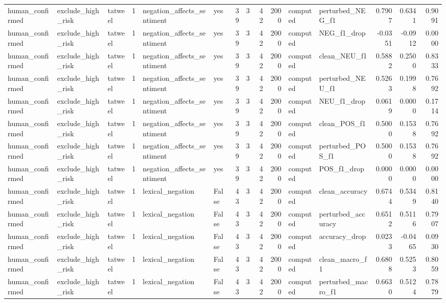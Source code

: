 \begin{tabular}{lllrllrrrrllrrr}
human_confirmed & exclude_high_risk & tatweel & 1 & negation_affects_sentiment & yes & 39 & 3 & 42 & 2000 & computed & perturbed_NEG_f1 & 0.7907 & 0.6341 & 0.9091 \\
human_confirmed & exclude_high_risk & tatweel & 1 & negation_affects_sentiment & yes & 39 & 3 & 42 & 2000 & computed & NEG_f1_drop & -0.0351 & -0.0912 & 0.0000 \\
human_confirmed & exclude_high_risk & tatweel & 1 & negation_affects_sentiment & yes & 39 & 3 & 42 & 2000 & computed & clean_NEU_f1 & 0.5882 & 0.2500 & 0.8333 \\
human_confirmed & exclude_high_risk & tatweel & 1 & negation_affects_sentiment & yes & 39 & 3 & 42 & 2000 & computed & perturbed_NEU_f1 & 0.5263 & 0.1998 & 0.7692 \\
human_confirmed & exclude_high_risk & tatweel & 1 & negation_affects_sentiment & yes & 39 & 3 & 42 & 2000 & computed & NEU_f1_drop & 0.0619 & 0.0000 & 0.1714 \\
human_confirmed & exclude_high_risk & tatweel & 1 & negation_affects_sentiment & yes & 39 & 3 & 42 & 2000 & computed & clean_POS_f1 & 0.5000 & 0.1538 & 0.7692 \\
human_confirmed & exclude_high_risk & tatweel & 1 & negation_affects_sentiment & yes & 39 & 3 & 42 & 2000 & computed & perturbed_POS_f1 & 0.5000 & 0.1538 & 0.7692 \\
human_confirmed & exclude_high_risk & tatweel & 1 & negation_affects_sentiment & yes & 39 & 3 & 42 & 2000 & computed & POS_f1_drop & 0.0000 & 0.0000 & 0.0000 \\
human_confirmed & exclude_high_risk & tatweel & 1 & lexical_negation & False & 43 & 3 & 42 & 2000 & computed & clean_accuracy & 0.6744 & 0.5349 & 0.8140 \\
human_confirmed & exclude_high_risk & tatweel & 1 & lexical_negation & False & 43 & 3 & 42 & 2000 & computed & perturbed_accuracy & 0.6512 & 0.5116 & 0.7907 \\
human_confirmed & exclude_high_risk & tatweel & 1 & lexical_negation & False & 43 & 3 & 42 & 2000 & computed & accuracy_drop & 0.0233 & -0.0465 & 0.0930 \\
human_confirmed & exclude_high_risk & tatweel & 1 & lexical_negation & False & 43 & 3 & 42 & 2000 & computed & clean_macro_f1 & 0.6808 & 0.5253 & 0.8059 \\
human_confirmed & exclude_high_risk & tatweel & 1 & lexical_negation & False & 43 & 3 & 42 & 2000 & computed & perturbed_macro_f1 & 0.6630 & 0.5124 & 0.7879 \\

\end{tabular}
